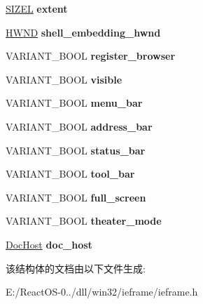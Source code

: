 \begin{DoxyCompactItemize}
\item 
\mbox{\label{struct_web_browser_a7b38dc3a8a9fe7c0a0ebf01d340cd6a5}} 
\hyperlink{structtag_s_i_z_e}{S\+I\+Z\+EL} {\bfseries extent}
\item 
\mbox{\label{struct_web_browser_a8b250d73b767dfc71c5e60580fb3ca8c}} 
\hyperlink{interfacevoid}{H\+W\+ND} {\bfseries shell\+\_\+embedding\+\_\+hwnd}
\item 
\mbox{\label{struct_web_browser_a0c947b9a1237ba350a98677aefb370f6}} 
V\+A\+R\+I\+A\+N\+T\+\_\+\+B\+O\+OL {\bfseries register\+\_\+browser}
\item 
\mbox{\label{struct_web_browser_a9b996f21338e800da0586f58922a4f22}} 
V\+A\+R\+I\+A\+N\+T\+\_\+\+B\+O\+OL {\bfseries visible}
\item 
\mbox{\label{struct_web_browser_aa6486c179280f2ac6b51b15019bf1eb9}} 
V\+A\+R\+I\+A\+N\+T\+\_\+\+B\+O\+OL {\bfseries menu\+\_\+bar}
\item 
\mbox{\label{struct_web_browser_ae0bb5fbbd5d292493e28a9e14c3ca42f}} 
V\+A\+R\+I\+A\+N\+T\+\_\+\+B\+O\+OL {\bfseries address\+\_\+bar}
\item 
\mbox{\label{struct_web_browser_a1b339b1a65425a1a529216aafb24c1b7}} 
V\+A\+R\+I\+A\+N\+T\+\_\+\+B\+O\+OL {\bfseries status\+\_\+bar}
\item 
\mbox{\label{struct_web_browser_a06c68648c8a59fbf4ade5841fc3c8401}} 
V\+A\+R\+I\+A\+N\+T\+\_\+\+B\+O\+OL {\bfseries tool\+\_\+bar}
\item 
\mbox{\label{struct_web_browser_ab38c4fc35a58f2318c90249eeda5cc42}} 
V\+A\+R\+I\+A\+N\+T\+\_\+\+B\+O\+OL {\bfseries full\+\_\+screen}
\item 
\mbox{\label{struct_web_browser_a553b65e791e1c8b8f8b47e04f7449607}} 
V\+A\+R\+I\+A\+N\+T\+\_\+\+B\+O\+OL {\bfseries theater\+\_\+mode}
\item 
\mbox{\label{struct_web_browser_a5775059c183d45a02cc6bdeb4139e813}} 
\hyperlink{struct_doc_host}{Doc\+Host} {\bfseries doc\+\_\+host}
\end{DoxyCompactItemize}


该结构体的文档由以下文件生成\+:\begin{DoxyCompactItemize}
\item 
E\+:/\+React\+O\+S-\/0../dll/win32/ieframe/ieframe.\+h\end{DoxyCompactItemize}
